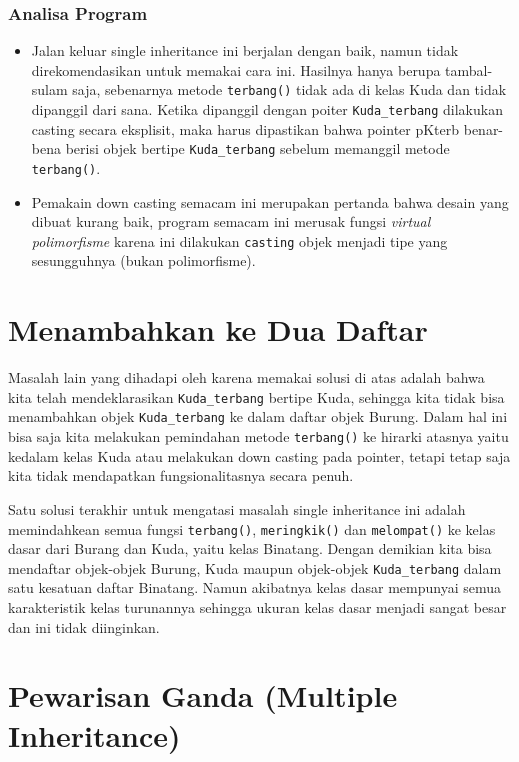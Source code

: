 \subsubsection*{Analisa Program}

\begin{itemize}

\item
 Jalan keluar single inheritance ini berjalan dengan baik, namun tidak
 direkomendasikan untuk memakai cara ini. Hasilnya hanya berupa
 tambal-sulam saja, sebenarnya metode \texttt{terbang()} tidak ada di
 kelas Kuda dan tidak dipanggil dari sana. Ketika dipanggil dengan
 poiter \texttt{Kuda\_terbang} dilakukan casting secara eksplisit, maka
 harus dipastikan bahwa pointer pKterb benar-bena berisi objek bertipe
 \texttt{Kuda\_terbang} sebelum memanggil metode \texttt{terbang()}.
\item
 Pemakain down casting semacam ini merupakan pertanda bahwa desain yang
 dibuat kurang baik, program semacam ini merusak fungsi \emph{virtual
 polimorfisme} karena ini dilakukan \texttt{casting} objek menjadi tipe
 yang sesungguhnya (bukan polimorfisme).
\end{itemize}

\section{Menambahkan ke Dua Daftar}\label{menambahkan-ke-dua-daftar}

Masalah lain yang dihadapi oleh karena memakai solusi di atas adalah
bahwa kita telah mendeklarasikan \texttt{Kuda\_terbang} bertipe Kuda,
sehingga kita tidak bisa menambahkan objek \texttt{Kuda\_terbang} ke
dalam daftar objek Burung. Dalam hal ini bisa saja kita melakukan
pemindahan metode \texttt{terbang()} ke hirarki atasnya yaitu kedalam
kelas Kuda atau melakukan down casting pada pointer, tetapi tetap saja
kita tidak mendapatkan fungsionalitasnya secara penuh.

Satu solusi terakhir untuk mengatasi masalah single inheritance ini
adalah memindahkean semua fungsi \texttt{terbang()},
\texttt{meringkik()} dan \texttt{melompat()} ke kelas dasar dari Burang
dan Kuda, yaitu kelas Binatang. Dengan demikian kita bisa mendaftar
objek-objek Burung, Kuda maupun objek-objek \texttt{Kuda\_terbang} dalam
satu kesatuan daftar Binatang. Namun akibatnya kelas dasar mempunyai
semua karakteristik kelas turunannya sehingga ukuran kelas dasar menjadi
sangat besar dan ini tidak diinginkan.

\section{Pewarisan Ganda (Multiple
Inheritance)}\label{pewarisan-ganda-multiple-inheritance}

